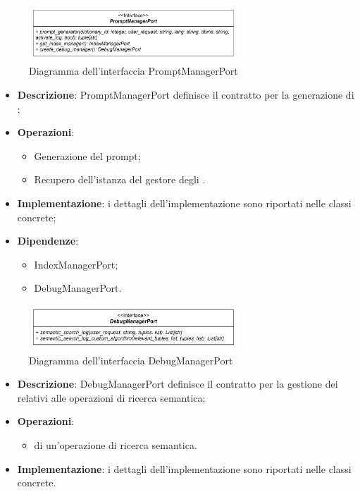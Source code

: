  \label{PromptManagerPort}
\begin{figure}[H]
    \centering
    \includegraphics[width=0.7\textwidth]{assets/Backend/prompt_manager_port.png}
    \caption{Diagramma dell'interfaccia PromptManagerPort}
  \end{figure}
\begin{itemize}
    \item \textbf{Descrizione}: PromptManagerPort definisce il contratto per la generazione di ;
    \item \textbf{Operazioni}:
    \begin{itemize}
      \item Generazione del prompt;
      \item Recupero dell'istanza del gestore degli .
    \end{itemize}
    \item \textbf{Implementazione}: i dettagli dell'implementazione sono riportati nelle classi concrete;
    \item \textbf{Dipendenze}:
    \begin{itemize}
        \item IndexManagerPort;
        \item DebugManagerPort.
    \end{itemize}
\end{itemize} 

 \label{DebugManagerPort}
\begin{figure}[H]
    \centering
    \includegraphics[width=0.7\textwidth]{assets/Backend/debug_manager_port.png}
    \caption{Diagramma dell'interfaccia DebugManagerPort}
  \end{figure}
\begin{itemize}
    \item \textbf{Descrizione}: DebugManagerPort definisce il contratto per la gestione dei  relativi alle operazioni di ricerca semantica;
    \item \textbf{Operazioni}:
    \begin{itemize}
      \item {} di un'operazione di ricerca semantica.
    \end{itemize}
    \item \textbf{Implementazione}: i dettagli dell'implementazione sono riportati nelle classi concrete.
\end{itemize}  

